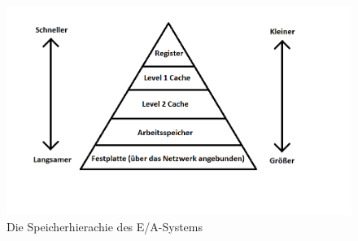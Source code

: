 \documentclass[
	12pt,
	a4paper,
	BCOR10mm,
	DIV14,
	listof=totoc,
	bibliography=totoc,
	headsepline
]{scrreprt}
\begin{document}
\begin{figure}[h]
	\begin{center}
		\includegraphics[height=.35\textwidth]{Bilder/hierachie.png}
	\end{center}
	\vspace*{-1cm}
	\caption{Die Speicherhierachie des E/A-Systems}
	\label{fig:mem_hierachie}
\end{figure}
\end{document}
